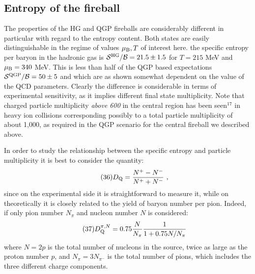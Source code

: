\begin{mdframed}[linecolor=gray,roundcorner=12pt,backgroundcolor=Dandelion!15,linewidth=1pt,leftmargin=0cm,rightmargin=0cm,topline=true,bottomline=true,skipabove=12pt]
\section*{Entropy of the fireball} 
The properties of the HG and QGP fireballs are considerably different in
particular with regard to the entropy content. Both states are easily
distinguishable in the regime of values $\mu_{\rm B},T$ of interest here.
the specific entropy per baryon in the hadronic gas is ${\cal S}^{\rm
HG}/{\cal B} =21.5\pm1.5$ for $T=215$ MeV and $\mu_{\rm B}=340$ MeV. 
This is less than half of the QGP based expectations ${\cal S}^{\rm
QGP}/{\cal B} =50\pm5$ and which are as shown somewhat dependent on the
value of the QCD parameters. Clearly the difference is considerable in
terms of experimental sensitivity, as it implies different final state
multiplicity. Note that charged particle multiplicity {\it above 600} in
the central region has been seen$^{17}$ in heavy ion collisions
corresponding possibly to a total particle multiplicity of about 1,000,
as required in the QGP scenario for the central fireball we described
above.
 
In order to study the relationship between the specific entropy and
particle multiplicity it is best to consider the quantity:
\begin{equation}
\tag{36} D_{\rm Q}= {{N^+-N^-}\over{N^++N^-}} \ ,
\end{equation}
since on the experimental side it is straightforward to measure it, while
on theoretically it is closely related to the yield of baryon number per
pion. Indeed, if only pion number $N_\pi$ and nucleon number $N$ is
considered:
\begin{equation}
\tag{37} D_{\rm Q}^{\pi,N} = 0.75 {N\over N_\pi} {1\over 1+0.75 N/N_\pi}
\end{equation}
where $N=2p$ is the total number of nucleons in the source, twice as
large as the proton number $p$, and $N_\pi=3N_{\pi^-}$ is the total
number of pions, which includes the three different charge components.


\end{mdframed}
